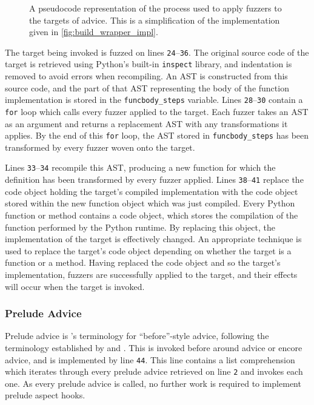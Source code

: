\begin{figure}
    \centering
    
    \caption{A pseudocode representation of the process used to apply fuzzers to
    the targets of advice. This is a simplification of the implementation given
    in \cref{fig:build_wrapper_impl}.}
    \label{fig:fuzzer_impl_pseudocode}
\end{figure}

The target being invoked is fuzzed on lines \texttt{24}--\texttt{36}. The
original source code of the target is retrieved using Python's built-in
\lstinline{inspect} library, and indentation is removed to avoid errors when
recompiling. An AST is constructed from this source code, and the part of that
AST representing the body of the function implementation is stored in the
\lstinline{funcbody_steps} variable. Lines \texttt{28}--\texttt{30} contain a
\lstinline{for} loop which calls every fuzzer applied to the target. Each fuzzer
takes an AST as an argument and returns a replacement AST with any
transformations it applies. By the end of this \lstinline{for} loop, the AST
stored in \lstinline{funcbody_steps} has been transformed by every fuzzer woven
onto the target.

Lines \texttt{33}--\texttt{34} recompile this AST, producing a new function for
which the definition has been transformed by every fuzzer applied. Lines
\texttt{38}--\texttt{41} replace the code object holding the target's compiled
implementation with the code object stored within the new function object which
was just compiled. Every Python function or method contains a code object, which
stores the compilation of the function performed by the Python runtime. By
replacing this object, the implementation of the target is effectively changed.
An appropriate technique is used to replace the target's code object depending
on whether the target is a function or a method. Having replaced the code object
and so the target's implementation, fuzzers are successfully applied to the
target, and their effects will occur when the target is invoked.


\subsubsection{Prelude Advice}

Prelude advice is \pdsfthree{}'s terminology for ``before''-style advice,
following the terminology established by \pydysofu and \theatreag{}. This is
invoked before around advice or encore advice, and is implemented by line
\texttt{44}. This line contains a list comprehension which iterates through
every prelude advice retrieved on line \texttt{2} and invokes each one. As every
prelude advice is called, no further work is required to implement prelude
aspect hooks.

